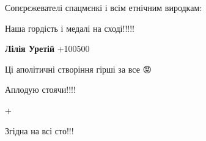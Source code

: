 \begin{itemize}
 

Сопєрєжевателі спацмєнкі і всім етнічним виродкам:

Наша гордість і медалі на сході!!!!!

\begin{itemize}
 
\textbf{Лілія Уретій} +100500💙💛💙💛💙💛
\end{itemize}

 
Ці аполітичні створіння гірші за все 😡

 
Аплодую стоячи!!!!

 
+

 
Згідна на всі сто!!!

 


\end{itemize}
